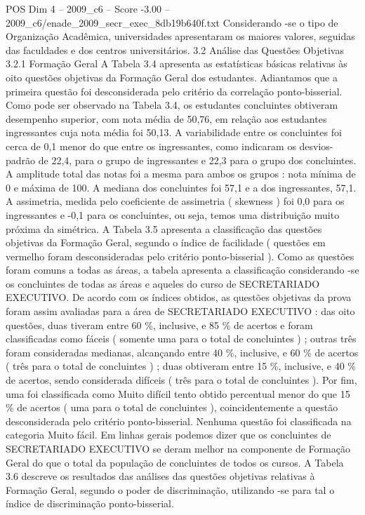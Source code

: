 \begin{textsample}{POS Dim 4 – 2009\_c6 – Score -3.00 – 2009\_c6/enade\_2009\_secr\_exec\_8db19b640f.txt}
Considerando -se o tipo de Organização Acadêmica, universidades apresentaram os maiores valores, seguidas das faculdades e dos centros universitários. 3.2 Análise das Questões Objetivas 3.2.1 Formação Geral A Tabela 3.4 apresenta as estatísticas básicas relativas às oito questões objetivas da Formação Geral dos estudantes.
Adiantamos que a primeira questão foi desconsiderada pelo critério da correlação ponto-bisserial.
Como pode ser observado na Tabela 3.4, os estudantes concluintes obtiveram desempenho superior, com nota média de 50,76, em relação aos estudantes ingressantes cuja nota média foi 50,13.
A variabilidade entre os concluintes foi cerca de 0,1 menor do que entre os ingressantes, como indicaram os desvios-padrão de 22,4, para o grupo de ingressantes e 22,3 para o grupo dos concluintes.
A amplitude total das notas foi a mesma para ambos os grupos : nota mínima de 0 e máxima de 100.
A mediana dos concluintes foi 57,1 e a dos ingressantes, 57,1.
A assimetria, medida pelo coeficiente de assimetria ( skewness ) foi 0,0 para os ingressantes e -0,1 para os concluintes, ou seja, temos uma distribuição muito próxima da simétrica.
A Tabela 3.5 apresenta a classificação das questões objetivas da Formação Geral, segundo o índice de facilidade ( questões em vermelho foram desconsideradas pelo critério ponto-bisserial ).
Como as questões foram comuns a todas as áreas, a tabela apresenta a classificação considerando -se os concluintes de todas as áreas e aqueles do curso de SECRETARIADO EXECUTIVO.
De acordo com os índices obtidos, as questões objetivas da prova foram assim avaliadas para a área de SECRETARIADO EXECUTIVO : das oito questões, duas tiveram entre 60 \%, inclusive, e 85 \% de acertos e foram classificadas como fáceis ( somente uma para o total de concluintes ) ; outras três foram consideradas medianas, alcançando entre 40 \%, inclusive, e 60 \% de acertos ( três para o total de concluintes ) ; duas obtiveram entre 15 \%, inclusive, e 40 \% de acertos, sendo considerada difíceis ( três para o total de concluintes ).
Por fim, uma foi classificada como Muito difícil tento obtido percentual menor do que 15 \% de acertos ( uma para o total de concluintes ), coincidentemente a questão desconsiderada pelo critério ponto-bisserial.
Nenhuma questão foi classificada na categoria Muito fácil.
Em linhas gerais podemos dizer que os concluintes de SECRETARIADO EXECUTIVO se deram melhor na componente de Formação Geral do que o total da população de concluintes de todos os cursos.
A Tabela 3.6 descreve os resultados das análises das questões objetivas relativas à Formação Geral, segundo o poder de discriminação, utilizando -se para tal o índice de discriminação ponto-bisserial.

\end{textsample}
